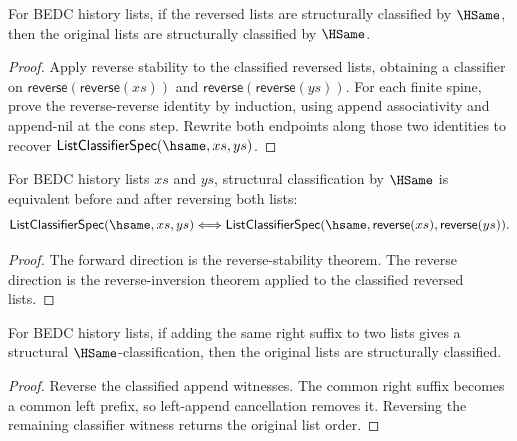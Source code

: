 \begin{theorem}
\label{thm:list-classifier-reverse-hsame-inversion}
For BEDC history lists, if the reversed lists are structurally classified by
\(\HSame\), then the original lists are structurally classified by \(\HSame\).
\end{theorem}
\begin{proof}
Apply reverse stability to the classified reversed lists, obtaining a
classifier on $\mathsf{reverse}(\mathsf{reverse}(xs))$ and
$\mathsf{reverse}(\mathsf{reverse}(ys))$. For each finite spine, prove the
reverse-reverse identity by induction, using append associativity and
append-nil at the cons step. Rewrite both endpoints along those two identities
to recover $\mathsf{ListClassifierSpec}(\hsame,xs,ys)$.
\end{proof}

\begin{theorem}
\label{thm:list-classifier-reverse-hsame-equiv}
For BEDC history lists $xs$ and $ys$, structural classification by $\HSame$ is equivalent before and after reversing both lists:
$$
  \mathsf{ListClassifierSpec}(\hsame,xs,ys)
  \Longleftrightarrow
  \mathsf{ListClassifierSpec}(\hsame,\mathsf{reverse}(xs),\mathsf{reverse}(ys)).
$$
\end{theorem}
\begin{proof}
The forward direction is the reverse-stability theorem. The reverse direction is the reverse-inversion theorem applied to the classified reversed lists.
\end{proof}

\begin{theorem}
\label{thm:list-classifier-append-right-cancel-hsame}
For BEDC history lists, if adding the same right suffix to two lists gives a
structural \(\HSame\)-classification, then the original lists are structurally
classified.
\end{theorem}
\begin{proof}
Reverse the classified append witnesses. The common right suffix becomes a
common left prefix, so left-append cancellation removes it. Reversing the
remaining classifier witness returns the original list order.
\end{proof}

